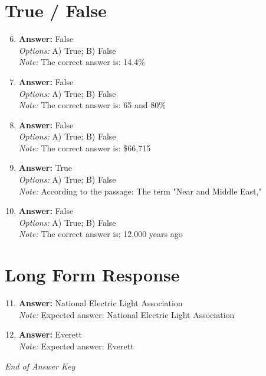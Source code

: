 \documentclass[12pt]{article}
\begin{document}
\section*{True / False}
\begin{enumerate}[label=\arabic*.]
\setcounter{enumi}{5}
\item \textbf{Answer:} False
\\ \textit{Options:} A) True; B) False
\\ \textit{Note:} The correct answer is: 14.4\%
\item \textbf{Answer:} False
\\ \textit{Options:} A) True; B) False
\\ \textit{Note:} The correct answer is: 65 and 80\%
\item \textbf{Answer:} False
\\ \textit{Options:} A) True; B) False
\\ \textit{Note:} The correct answer is: \$66,715
\item \textbf{Answer:} True
\\ \textit{Options:} A) True; B) False
\\ \textit{Note:} According to the passage: The term "Near and Middle East,"
\item \textbf{Answer:} False
\\ \textit{Options:} A) True; B) False
\\ \textit{Note:} The correct answer is: 12,000 years ago
\end{enumerate}

\section*{Long Form Response}
\begin{enumerate}[label=\arabic*.]
\setcounter{enumi}{10}
\item \textbf{Answer:} National Electric Light Association
\\ \textit{Note:} Expected answer: National Electric Light Association
\item \textbf{Answer:} Everett
\\ \textit{Note:} Expected answer: Everett
\end{enumerate}

\vfill
\noindent\textit{End of Answer Key}
\end{document}

